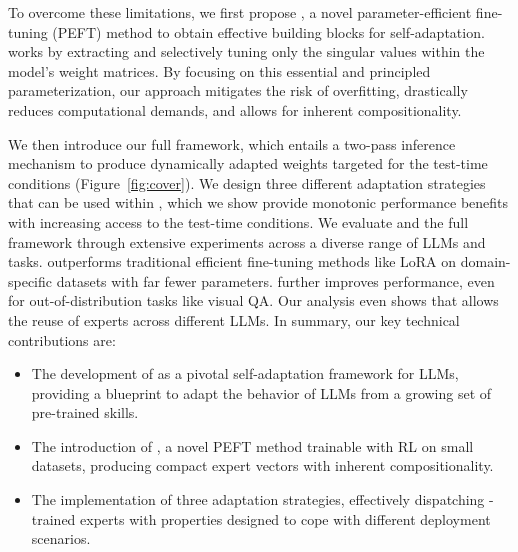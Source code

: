 To overcome these limitations, we first propose \svdacro, a novel parameter-efficient fine-tuning (PEFT) method to obtain effective building blocks for self-adaptation.
\svdacro works by extracting and selectively tuning only the singular values within the model's weight matrices.
By focusing on this essential and principled parameterization, our approach mitigates the risk of overfitting, drastically reduces computational demands, and allows for inherent compositionality.

We then introduce our full \implname framework, which entails a two-pass inference mechanism to produce dynamically adapted weights targeted for the test-time conditions (Figure~\ref{fig:cover}).
We design three different adaptation strategies that can be used within \implname, which we show provide monotonic performance benefits with increasing access to the test-time conditions.
We evaluate \svdacro and the full \implname framework through extensive experiments across a diverse range of LLMs and tasks.
\svdacro outperforms traditional efficient fine-tuning methods like LoRA on domain-specific datasets with far fewer parameters. 
\implname further improves performance, even for out-of-distribution tasks like visual QA. 
Our analysis even shows that \implname allows the reuse of \svdacro experts across different LLMs. In summary, our key technical contributions are: 
\vspace{-2mm}
\begin{itemize}
\item The development of \implname as a pivotal self-adaptation framework for LLMs, providing a blueprint to adapt the behavior of LLMs from a growing set of pre-trained skills.
\item The introduction of \svdacro, a novel PEFT method trainable with RL on small datasets, producing compact expert vectors with inherent compositionality.
\item The implementation of three adaptation strategies, effectively dispatching \svdacro-trained experts with properties designed to cope with different deployment scenarios.
\end{itemize}

\vspace{-2mm}